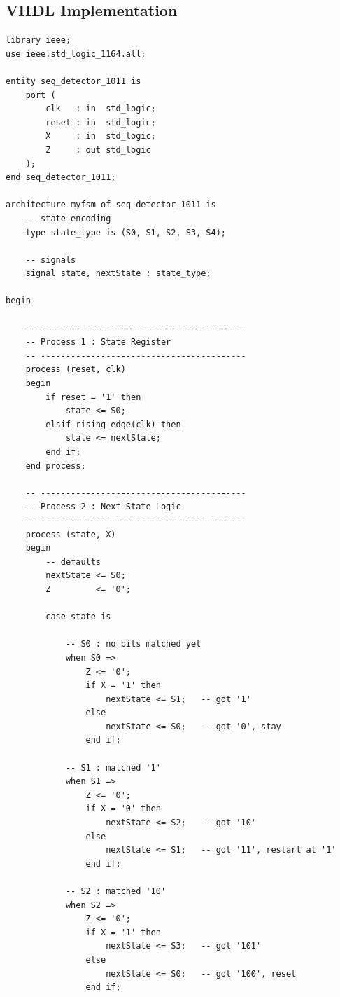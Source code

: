 \documentclass[12pt,a4paper]{article}
\begin{document}
\subsection{VHDL Implementation}

\begin{tcolorbox}[vhdlbox, title={Level 2 --- seq\_detector\_1011.vhd}]
\begin{lstlisting}[style=vhdlstyle]
library ieee;
use ieee.std_logic_1164.all;

entity seq_detector_1011 is
    port (
        clk   : in  std_logic;
        reset : in  std_logic;
        X     : in  std_logic;
        Z     : out std_logic
    );
end seq_detector_1011;

architecture myfsm of seq_detector_1011 is
    -- state encoding
    type state_type is (S0, S1, S2, S3, S4);

    -- signals
    signal state, nextState : state_type;

begin

    -- -----------------------------------------
    -- Process 1 : State Register
    -- -----------------------------------------
    process (reset, clk)
    begin
        if reset = '1' then
            state <= S0;
        elsif rising_edge(clk) then
            state <= nextState;
        end if;
    end process;

    -- -----------------------------------------
    -- Process 2 : Next-State Logic
    -- -----------------------------------------
    process (state, X)
    begin
        -- defaults
        nextState <= S0;
        Z         <= '0';

        case state is

            -- S0 : no bits matched yet
            when S0 =>
                Z <= '0';
                if X = '1' then
                    nextState <= S1;   -- got '1'
                else
                    nextState <= S0;   -- got '0', stay
                end if;

            -- S1 : matched '1'
            when S1 =>
                Z <= '0';
                if X = '0' then
                    nextState <= S2;   -- got '10'
                else
                    nextState <= S1;   -- got '11', restart at '1'
                end if;

            -- S2 : matched '10'
            when S2 =>
                Z <= '0';
                if X = '1' then
                    nextState <= S3;   -- got '101'
                else
                    nextState <= S0;   -- got '100', reset
                end if;


\end{lstlisting}
\end{tcolorbox}
\end{document}
